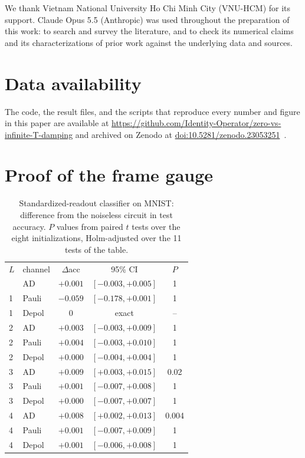 \documentclass[
 aps,pra,
 twocolumn,
 superscriptaddress,
 longbibliography,
 nofootinbib
]{revtex4-2}
\begin{document}
\begin{acknowledgments}

We thank Vietnam National University Ho Chi Minh City (VNU-HCM) for its support.
Claude Opus 5.5 (Anthropic) was used throughout the preparation of this work: to
search and survey the literature, and to
check its numerical claims and its characterizations of prior work against the
underlying data and sources.

\end{acknowledgments}

\section*{Data availability}
The code, the result files, and the scripts that reproduce every number and
figure in this paper are available at
\url{https://github.com/Identity-Operator/zero-vs-infinite-T-damping} and archived
on Zenodo at \href{https://doi.org/10.5281/zenodo.23053251}{doi:10.5281/zenodo.23053251}~\cite{nguyen2026zenodo}.

\appendix

\section{Proof of the frame gauge}
\label{app:gauge}

\begin{table}[t]
\caption{Standardized-readout classifier on MNIST: difference from the
noiseless circuit in test accuracy. $P$ values from paired $t$ tests over the
eight initializations, Holm-adjusted over the 11 tests of the table.}
\label{tab:stats}
\begin{ruledtabular}
\begin{tabular}{llccc}
$L$ & channel & $\Delta$acc & 95\% CI & $P$\\
\colrule
1 & AD & $+0.001$ & $[-0.003,+0.005]$ & 1\\
1 & Pauli & $-0.059$ & $[-0.178,+0.001]$ & 1\\
1 & Depol & $0$ & exact & --\\
2 & AD & $+0.003$ & $[-0.003,+0.009]$ & 1\\
2 & Pauli & $+0.004$ & $[-0.003,+0.010]$ & 1\\
2 & Depol & $+0.000$ & $[-0.004,+0.004]$ & 1\\
3 & AD & $+0.009$ & $[+0.003,+0.015]$ & 0.02\\
3 & Pauli & $+0.001$ & $[-0.007,+0.008]$ & 1\\
3 & Depol & $+0.000$ & $[-0.007,+0.007]$ & 1\\
4 & AD & $+0.008$ & $[+0.002,+0.013]$ & 0.004\\
4 & Pauli & $+0.001$ & $[-0.007,+0.009]$ & 1\\
4 & Depol & $+0.001$ & $[-0.006,+0.008]$ & 1\\
\end{tabular}
\end{ruledtabular}
\end{table}
\end{document}
